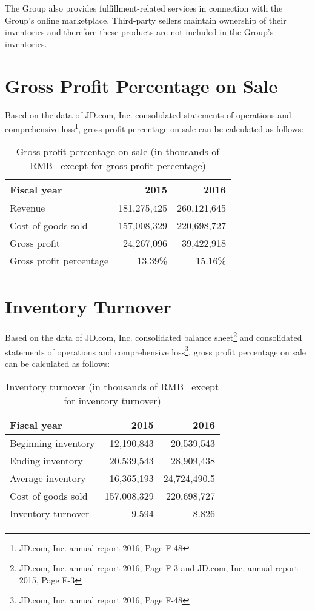 The Group also provides fulfillment-related services in connection with the Group’s online marketplace. Third-party sellers maintain ownership of their
inventories and therefore these products are not included in the Group’s inventories.
\section{Gross Profit Percentage on Sale}

Based on the data of JD.com, Inc. consolidated statements of operations and comprehensive loss\footnote{JD.com, Inc. annual report 2016, Page F-48}, gross profit percentage on sale can be calculated as follows:

\begin{table}[H]	
	\begin{center}
		\begin{tabular}{lrr}
			\toprule
			\textbf{Fiscal year}&\textbf{2015}&\textbf{2016}\\
			\midrule
			Revenue&181,275,425&260,121,645\\
			Cost of goods sold&157,008,329&220,698,727\\
			Gross profit&24,267,096&39,422,918\\
			Gross profit percentage&13.39\%&15.16\%\\
			\bottomrule
		\end{tabular}
	\end{center}
	\caption{Gross profit percentage on sale (in thousands of RMB \textyen\ except for gross profit percentage)}\label{table:1}
\end{table}

\section{Inventory Turnover}
Based on the data of JD.com, Inc. consolidated balance sheet\footnote{JD.com, Inc. annual report 2016, Page F-3 and JD.com, Inc. annual report 2015, Page F-3} and consolidated statements of operations and comprehensive loss\footnote{JD.com, Inc. annual report 2016, Page F-48}, gross profit percentage on sale can be calculated as follows:

\begin{table}[H]	
	\begin{center}
		\begin{tabular}{lrr}
			\toprule
			\textbf{Fiscal year}&\textbf{2015}&\textbf{2016}\\
			\midrule
			Beginning inventory &12,190,843&20,539,543\\
			Ending inventory  &20,539,543&28,909,438\\
			Average inventory &16,365,193&24,724,490.5\\
			Cost of goods sold &157,008,329&220,698,727\\
			Inventory turnover &9.594&8.826\\
			\bottomrule
		\end{tabular}
	\end{center}
	\caption{Inventory turnover (in thousands of RMB \textyen\ except for inventory turnover)}\label{table:1}
\end{table}



